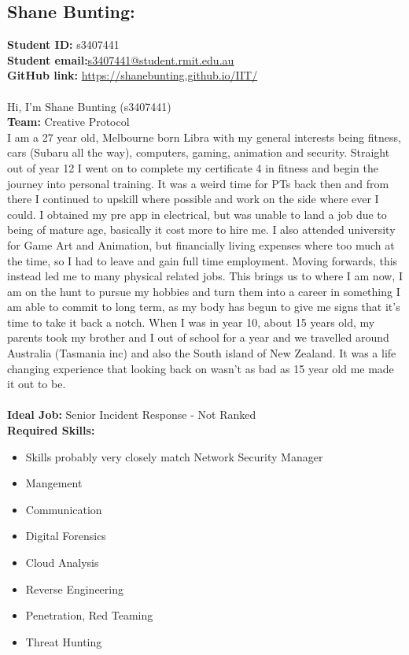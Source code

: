 \documentclass[11pt, oneside, a4paper, titlepage]{article}
\begin{document}
\subsection{Shane Bunting:}
\textbf{Student ID:} \hfill s3407441\\
\textbf{Student email:}\hfill \href{mailto:s3407441@student.rmit.edu.au}{s3407441@student.rmit.edu.au}\\
\textbf{GitHub link:} \hfill \href{https://shanebunting.github.io/IIT/}{https://shanebunting.github.io/IIT/}\\
\\
Hi, I'm Shane Bunting (s3407441)
\\
\textbf{Team:} Creative Protocol 
\\
I am a 27 year old, Melbourne born Libra with my general interests being fitness, cars (Subaru all the way), computers, gaming, animation and security. Straight out of year 12 I went on to complete my certificate 4 in fitness and begin the journey into personal training. It was a weird time for PTs back then and from there I continued to upskill where possible and work on the side where ever I could. I obtained my pre app in electrical, but was unable to land a job due to being of mature age, basically it cost more to hire me.  I also attended university for Game Art and Animation, but financially living expenses where too much at the time, so I had to leave and gain full time employment. Moving forwards, this instead led me to many physical related jobs. This brings us to where I am now, I am on the hunt to pursue my hobbies and turn them into a career in something I am able to commit to long term, as my body has begun to give me signs that it's time to take it back a notch. When I was in year 10, about 15 years old, my parents took my brother and I out of school for a year and we travelled around Australia (Tasmania inc) and also the South island of New Zealand. It was a life changing experience that looking back on wasn’t as bad as 15 year old me made it out to be.
\\
\\
\textbf{Ideal Job:} \hfill Senior Incident Response - Not Ranked\\
\textbf{Required Skills:} 
\begin{itemize}
	\setlength\itemsep{0em}
	\item	Skills probably very closely match Network Security Manager
	\item	Mangement
	\item Communication
	\item Digital Forensics
	\item Cloud Analysis
	\item Reverse Engineering
	\item Penetration, Red Teaming
	\item Threat Hunting
\end{itemize}
\newpage
\end{document}
